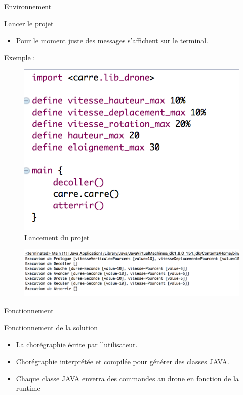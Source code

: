 \documentclass{bredelebeamer}
\begin{document}
\begin{frame}{Environnement}
\begin{block}{Lancer le projet}
\begin{itemize}
\item Pour le moment juste des messages s'affichent sur le terminal.
\end{itemize}

\end{block}
Exemple : \pause
\begin{figure}
\centering
\includegraphics[scale=0.3]{images/12.png}
\caption{Lancement du projet}
\end{figure}
\begin{figure}
\centering
\includegraphics[scale=0.4]{images/13.png}
\end{figure}
\end{frame}

\begin{frame}{Fonctionnement}
\begin{block}{Fonctionnement de la solution}
\begin{itemize}
\item La chorégraphie écrite par l'utilisateur.
\item Chorégraphie interprétée et compilée pour générer des classes JAVA.
\item Chaque classe JAVA enverra des commandes au drone en fonction de la runtime
\end{itemize}
\end{block}
\end{frame}
\end{document}
